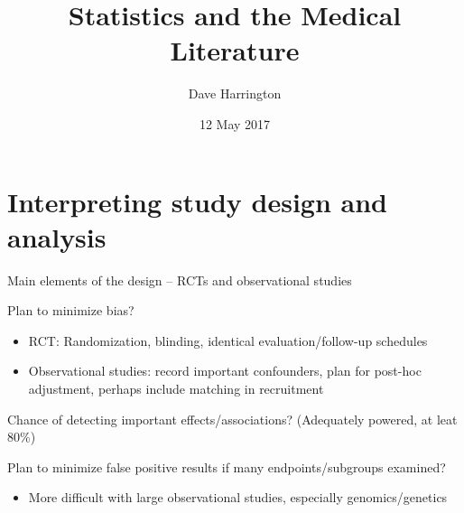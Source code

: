 \documentclass[ignorenonframetext,]{beamer}
\title{Statistics and the Medical Literature}
\author{Dave Harrington}
\date{12 May 2017}
\providecommand{\tightlist}{%
\setlength{\itemsep}{0pt}\setlength{\parskip}{0pt}}
\begin{document}
\frame{\titlepage}

\begin{frame}
\tableofcontents[hideallsubsections]
\end{frame}

\section{Interpreting study design and
analysis}\label{interpreting-study-design-and-analysis}

\begin{frame}{Main elements of the design -- RCTs and observational
studies}

Plan to minimize bias?

\begin{itemize}
\item
  RCT: Randomization, blinding, identical evaluation/follow-up schedules
\item
  Observational studies: record important confounders, plan for post-hoc
  adjustment, perhaps include matching in recruitment
\end{itemize}

Chance of detecting important effects/associations? (Adequately powered,
at leat 80\%) \medskip

Plan to minimize false positive results if many endpoints/subgroups
examined?

\begin{itemize}
\tightlist
\item
  More difficult with large observational studies, especially
  genomics/genetics
\end{itemize}

\end{frame}
\end{document}

